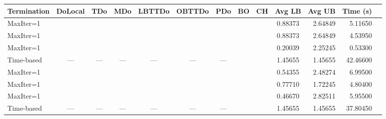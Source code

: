 \documentclass[11pt,reqno,a4paper]{amsart}
\numberwithin{equation}{section}
\theoremstyle{mytheorem}
\theoremstyle{myremark}
\theoremstyle{myparagraph}
\newcommand{\yes}{\ding{51}}
\newcommand{\no}{\ding{55}}
\newcommand{\na}{---} %
\begin{document}
    \begin{table}[ht]
        \centering
        \scriptsize
        \renewcommand{\arraystretch}{1.2}
        \setlength{\tabcolsep}{4pt}
        \begin{threeparttable}
            \begin{tabular}{l c c c c c c c c c r r r}
                \toprule
                \textbf{Termination} & \textbf{DoLocal} & \textbf{TDo} & \textbf{MDo} & \textbf{LBTTDo} & \textbf{OBTTDo} & \textbf{PDo} & \textbf{BO} & \textbf{CH} & \textbf{Avg LB} & \textbf{Avg UB} & \textbf{Time (s)} \\
                \midrule
                MaxIter=1            & \yes             & \yes         & \yes         & \yes            & \yes            & \yes         & \no         & \no         & 0.88373         & 2.64849         & 5.11650           \\
                MaxIter=1            & \no              & \no          & \no          & \yes            & \no             & \no          & \no         & \no         & 0.88373         & 2.64849         & 4.53950           \\
                MaxIter=1            & \yes             & \yes         & \yes         & \no             & \yes            & \yes         & \no         & \no         & 0.20039         & 2.25245         & 0.53300           \\
                Time-based           & \na              & \na          & \na          & \na             & \na             & \na          & \no         & \no         & 1.45655         & 1.45655         & 42.46600          \\
                MaxIter=1            & \yes             & \yes         & \yes         & \yes            & \yes            & \yes         & \yes        & \no         & 0.54355         & 2.48274         & 6.99500           \\
                MaxIter=1            & \yes             & \yes         & \yes         & \yes            & \yes            & \yes         & \no         & \yes        & 0.77710         & 1.72245         & 4.80400           \\
                MaxIter=1            & \yes             & \yes         & \yes         & \yes            & \yes            & \yes         & \yes        & \yes        & 0.46670         & 2.82511         & 5.95500           \\
                Time-based           & \na              & \na          & \na          & \na             & \na             & \na          & \yes        & \no         & 1.45655         & 1.45655         & 37.80450          \\

\end{tabular}
\end{threeparttable}
\end{table}
\end{document}

